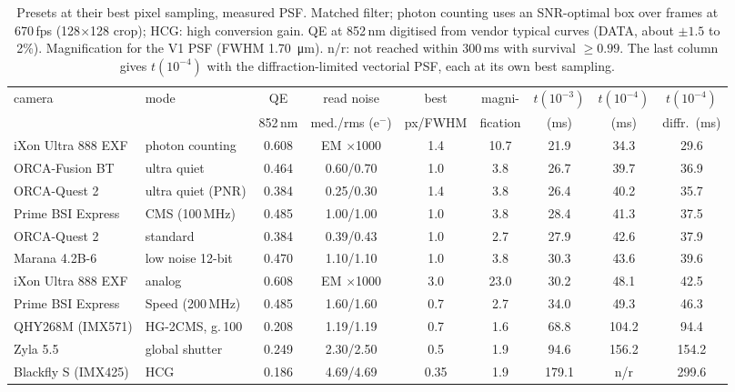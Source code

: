 \documentclass[11pt,a4paper]{article}
\newcommand{\elec}{e$^-$}
\begin{document}
\begin{table}[htbp]
\centering
\caption{Presets at their best pixel sampling, measured PSF. Matched filter; photon counting uses an
SNR-optimal box over frames at 670\,fps (128$\times$128 crop); HCG: high conversion gain. QE at 852\,nm digitised from vendor
typical curves (DATA, about $\pm1.5$ to 2\%). Magnification for the V1 PSF (FWHM
\SI{1.70}{\micro\metre}). n/r: not reached within 300\,ms with survival $\geq 0.99$. The last column
gives $t(10^{-4})$ with the diffraction-limited vectorial PSF, each at its own best sampling.}
\label{tab:presets}
\footnotesize
\setlength{\tabcolsep}{2.8pt}
\begin{tabular}{@{}l l c c c c c c c@{}}
\toprule
camera & mode & QE & read noise & best & magni- & $t(10^{-3})$ & $t(10^{-4})$ & $t(10^{-4})$ \\
 & & 852\,nm & med./rms (\elec) & px/FWHM & fication & (ms) & (ms) & diffr.\ (ms) \\
\midrule
iXon Ultra 888 EXF & photon counting & 0.608 & EM $\times$1000 & 1.4 & 10.7 & 21.9 & 34.3 & 29.6 \\
ORCA-Fusion BT & ultra quiet & 0.464 & 0.60/0.70 & 1.0 & 3.8 & 26.7 & 39.7 & 36.9 \\
ORCA-Quest 2 & ultra quiet (PNR) & 0.384 & 0.25/0.30 & 1.4 & 3.8 & 26.4 & 40.2 & 35.7 \\
Prime BSI Express & CMS (100\,MHz) & 0.485 & 1.00/1.00 & 1.0 & 3.8 & 28.4 & 41.3 & 37.5 \\
ORCA-Quest 2 & standard & 0.384 & 0.39/0.43 & 1.0 & 2.7 & 27.9 & 42.6 & 37.9 \\
Marana 4.2B-6 & low noise 12-bit & 0.470 & 1.10/1.10 & 1.0 & 3.8 & 30.3 & 43.6 & 39.6 \\
iXon Ultra 888 EXF & analog & 0.608 & EM $\times$1000 & 3.0 & 23.0 & 30.2 & 48.1 & 42.5 \\
Prime BSI Express & Speed (200\,MHz) & 0.485 & 1.60/1.60 & 0.7 & 2.7 & 34.0 & 49.3 & 46.3 \\
QHY268M (IMX571) & HG-2CMS, g.\,100 & 0.208 & 1.19/1.19 & 0.7 & 1.6 & 68.8 & 104.2 & 94.4 \\
Zyla 5.5 & global shutter & 0.249 & 2.30/2.50 & 0.5 & 1.9 & 94.6 & 156.2 & 154.2 \\
Blackfly S (IMX425) & HCG & 0.186 & 4.69/4.69 & 0.35 & 1.9 & 179.1 & n/r & 299.6 \\
\bottomrule
\end{tabular}
\end{table}
\end{document}
